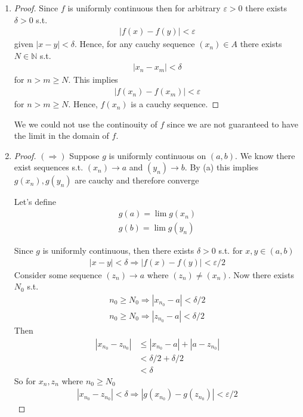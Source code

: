 \begin{enumerate}[label=(\alph*)]
    \item 
    \begin{proof}
        Since $f$ is uniformly continuous then for arbitrary
        $\varepsilon>0$ there exists $\delta >0$ s.t. 
        \begin{align*}
            |f(x)-f(y)|<\varepsilon
        \end{align*}
        given $|x-y|<\delta$.
        Hence, for any cauchy sequence $(x_n)\in A$ there exists 
        $N\in \mathbb{N}$ s.t. 
        \begin{align*}
            |x_n-x_m|< \delta 
        \end{align*}
        for $n>m\geq N$.
        This implies 
        \begin{align*}
            |f(x_n)-f(x_m)|<\varepsilon
        \end{align*}
        for $n>m\geq N$. Hence, $f(x_n)$ is a cauchy sequence.
    \end{proof}

    We we could not use the continouity of $f$ since we are 
    not guaranteed to have the limit in the domain of $f$.

    \item
    \begin{proof}
        $(\Rightarrow)$ 
        Suppose $g$ is uniformly continuous on 
        $(a,b)$. We know there exist sequences s.t. $(x_n)\rightarrow a$
        and $(y_n)\rightarrow b$. By (a) this implies $g(x_n),g(y_n)$
        are cauchy and therefore converge

        Let's define 
        \begin{gather*}
            g(a) = \lim g(x_n) \\
            g(b) = \lim g(y_n)
        \end{gather*}

        Since $g$ is uniformly continuous, then there exists
        $\delta >0$ s.t. for $x, y\in (a,b)$
        \begin{align*}
            |x-y| < \delta \Rightarrow |f(x)-f(y)| < \varepsilon/2
        \end{align*}
        Consider some sequence $(z_n)\rightarrow a$ where 
        $(z_n)\neq (x_n)$.
        Now there exists $N_0$ s.t. 
        \begin{gather*}
            n_0 \geq N_0 \Rightarrow |x_{n_0}-a| < \delta/2 \\
            n_0 \geq N_0 \Rightarrow |z_{n_0}-a| < \delta/2
        \end{gather*}
        Then
        \begin{align*}
            |x_{n_0}-z_{n_0}| &\leq |x_{n_0}-a| + |a-z_{n_0}| \\
            &< \delta/2 + \delta /2 \\
            &< \delta
        \end{align*}
        So for $x_n, z_n$ where ${n_0}\geq N_0$
        \begin{align*}
            |x_{n_0}-z_{n_0}| < \delta \Rightarrow |g(x_{n_0}) - g(z_{n_0})| < \varepsilon/2
        \end{align*}


\end{proof}
\end{enumerate}
